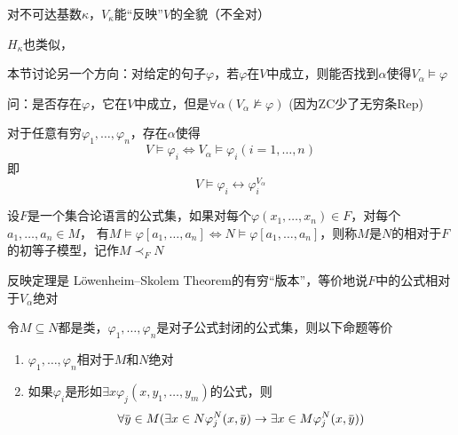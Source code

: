 \documentclass[11pt]{article}
\def \ZC {\text{ZC}}
\begin{document}
对不可达基数\(\kappa\)，\(V_\kappa\)能“反映”\(V\)的全貌（不全对）

\(H_\kappa\)也类似，


本节讨论另一个方向：对给定的句子\(\varphi\)，若\(\varphi\)在\(V\)中成立，则能否找到\(\alpha\)使得\(V_\alpha\vDash\varphi\)

问：是否存在\(\varphi\)，它在\(V\)中成立，但是\(\forall \alpha(V_\alpha\not\vDash\varphi)\) (因为\(\ZC\)少了无穷条Rep)

\begin{theorem}[反映定理]
对于任意有穷\(\varphi_1,\dots,\varphi_n\)，存在\(\alpha\)使得
\begin{equation*}
V\vDash\varphi_i\Leftrightarrow V_\alpha\vDash\varphi_i(i=1,\dots,n)
\end{equation*}
即
\begin{equation*}
V\vDash\varphi_i\leftrightarrow\varphi_i^{V_\alpha}
\end{equation*}
\end{theorem}

设\(F\)是一个集合论语言的公式集，如果对每个\(\varphi(x_1,\dots,x_n)\in F\)，对每个\(a_1,\dots,a_n\in M\)，
有\(M\vDash\varphi[a_1,\dots,a_n]\Leftrightarrow N\vDash\varphi[a_1,\dots,a_n]\)，则称\(M\)是\(N\)的相对于\(F\)的初等子模型，记作\(M\prec_FN\)

反映定理是 Löwenheim–Skolem Theorem的有穷“版本”，等价地说\(F\)中的公式相对于\(V_\alpha\)绝对

\begin{lemma}[]
令\(M\subseteq N\)都是类，\(\varphi_1,\dots,\varphi_n\)是对子公式封闭的公式集，则以下命题等价
\begin{enumerate}
\item \(\varphi_1,\dots,\varphi_n\)相对于\(M\)和\(N\)绝对
\item 如果\(\varphi_i\)是形如\(\exists x\varphi_j(x,y_1,\dots,y_m)\)的公式，则
\begin{equation*}
\forall\bary\in M(\exists x\in N\varphi_j^N(x,\bary)\to\exists x\in M\varphi_j^N(x,\bary))
\end{equation*}
\end{enumerate}
\end{lemma}
\end{document}
